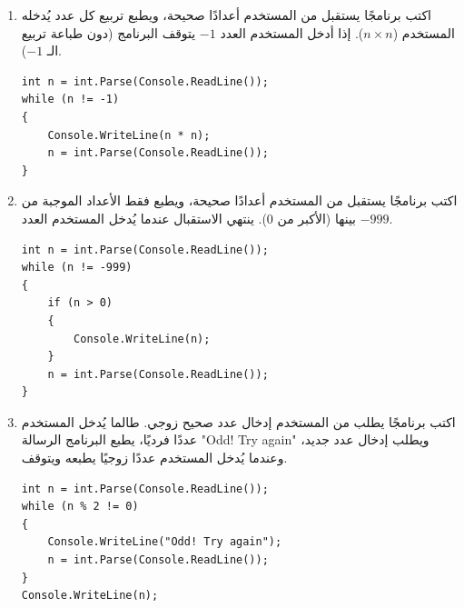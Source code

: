 \documentclass[14pt]{extarticle}
\begin{document}
\begin{enumerate}[resume, itemsep=1em]

\item اكتب برنامجًا يستقبل من المستخدم أعدادًا صحيحة، ويطبع تربيع كل عدد يُدخله المستخدم ($n \times n$). إذا أدخل المستخدم العدد $-1$ يتوقف البرنامج (دون طباعة تربيع الـ $-1$).
\ifwithsols
\begin{boxSolution}
\begin{english}
\begin{verbatim}
int n = int.Parse(Console.ReadLine());
while (n != -1)
{
    Console.WriteLine(n * n);
    n = int.Parse(Console.ReadLine());
}
\end{verbatim}
\end{english}
\end{boxSolution}
\fi
\filbreak

\item اكتب برنامجًا يستقبل من المستخدم أعدادًا صحيحة، ويطبع فقط الأعداد الموجبة من بينها (الأكبر من $0$). ينتهي الاستقبال عندما يُدخل المستخدم العدد $-999$.
\ifwithsols
\begin{boxSolution}
\begin{english}
\begin{verbatim}
int n = int.Parse(Console.ReadLine());
while (n != -999)
{
    if (n > 0)
    {
        Console.WriteLine(n);
    }
    n = int.Parse(Console.ReadLine());
}
\end{verbatim}
\end{english}
\end{boxSolution}
\fi
\filbreak

\item اكتب برنامجًا يطلب من المستخدم إدخال عدد صحيح زوجي. طالما يُدخل المستخدم عددًا فرديًا، يطبع البرنامج الرسالة \textenglish{"Odd! Try again"} ويطلب إدخال عدد جديد، وعندما يُدخل المستخدم عددًا زوجيًا يطبعه ويتوقف.
\ifwithsols
\begin{boxSolution}
\begin{english}
\begin{verbatim}
int n = int.Parse(Console.ReadLine());
while (n % 2 != 0)
{
    Console.WriteLine("Odd! Try again");
    n = int.Parse(Console.ReadLine());
}
Console.WriteLine(n);
\end{verbatim}
\end{english}
\end{boxSolution}
\fi
\filbreak


\end{enumerate}
\end{document}
